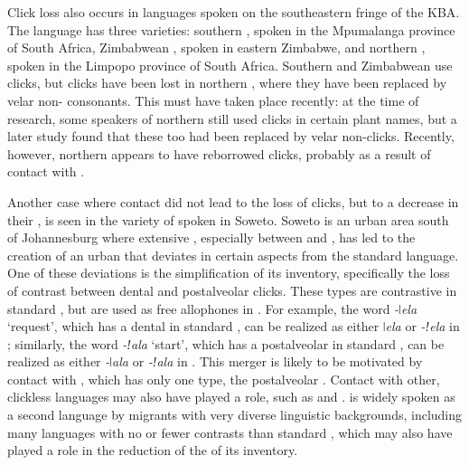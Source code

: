 \documentclass[output=paper,newtxmath,modfonts,nonflat,draftmode]{langsci/langscibook}
\begin{document}
Click loss also occurs in   languages spoken on the southeastern fringe of the KBA. The  language  has three varieties: southern , spoken in the Mpumalanga province of South Africa, Zimbabwean , spoken in eastern Zimbabwe, and northern , spoken in the Limpopo province of South Africa. Southern and Zimbabwean  use clicks, but clicks have been lost in northern , where they have been replaced by velar non- consonants. This  must have taken place recently: at the time of  research, some speakers of northern  still used clicks in certain plant names, but a later study \citep{Skhosana2009} found that these too had been replaced by velar non-clicks. Recently, however, northern  appears to have reborrowed clicks, probably as a result of contact with  \citep{schulzlaine2016}. 

Another case where contact did not lead to the loss of clicks, but to a decrease in their , is seen in the variety of  spoken in Soweto. Soweto is an urban area south of Johannesburg where extensive , especially between  and , has led to the creation of an urban  that deviates in certain aspects from the standard language. One of these deviations is the simplification of its  inventory, specifically the loss of contrast between dental and postalveolar clicks. These  types are contrastive in standard , but are used as free allophones in . For example, the word \textit{-ǀela} ‘request’, which has a dental  in standard , can be realized as either \textit{\-ǀela} or \textit{-ǃela} in ; similarly, the word \textit{-ǃala} ‘start’, which has a postalveolar  in standard , can be realized as either \textit{-ǀala} or \textit{-ǃala} in  \citep[164-165]{Gunnink2014}. This merger is likely to be motivated by contact with , which has only one  type, the postalveolar . Contact with other, clickless  languages may also have played a role, such as  and .  is widely spoken as a second language by migrants with very diverse linguistic backgrounds, including many languages with no or fewer  contrasts than standard , which may also have played a role in the reduction of the  of its  inventory.
\end{document}
